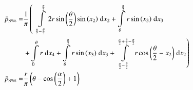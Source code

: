 \begin{align}
    \bar{p}_{\text{\tiny{NW6}}} =&\frac{1}{\pi} \left(\;\;\int\limits_{\frac{\pi}{2} - \frac{\theta}{2}}^{\frac{\pi}{2}}2 r \sin{\left (\frac{\theta}{2} \right )} \sin{\left (x_{2} \right )}\;\mathrm{d}x_{2}+\int\limits_{\theta}^{\frac{\pi}{2}}r \sin{\left (x_{3} \right )}\;\mathrm{d}x_{3}\right.\notag\\
 &\left.+\int\limits_{0}^{\theta}r\;\mathrm{d}x_{4}+\int\limits_{\theta}^{\frac{\pi}{2}}r \sin{\left (x_{3} \right )}\;\mathrm{d}x_{3}+\int\limits_{\frac{\pi}{2} - \frac{\theta}{2}}^{\frac{\alpha}{2} + \frac{\theta}{2} - \frac{\pi}{2}}r \cos{\left (\frac{\theta}{2} - x_{2} \right )}\;\mathrm{d}x_{2}\right)\label{pNW6Def}\\
    \bar{p}_{\text{\tiny{NW6}}}  =& \frac{r}{\pi} \left(\theta - \cos{\left (\frac{\alpha}{2} \right )} + 1\right)\label{pNW6Sln}
\end{align}
